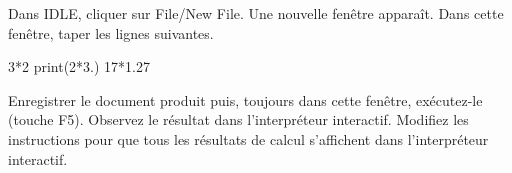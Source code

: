 Dans IDLE, cliquer sur File/New File. Une nouvelle fenêtre apparaît. Dans cette fenêtre, taper les lignes suivantes.
\begin{pyverbatim}
3*2
print(2*3.)
17*1.27
\end{pyverbatim}
Enregistrer le document produit puis, toujours dans cette fenêtre, exécutez-le (touche F5). 
Observez le résultat dans l'interpréteur interactif. 
Modifiez les instructions pour que tous les résultats de calcul s'affichent dans l'interpréteur interactif.
